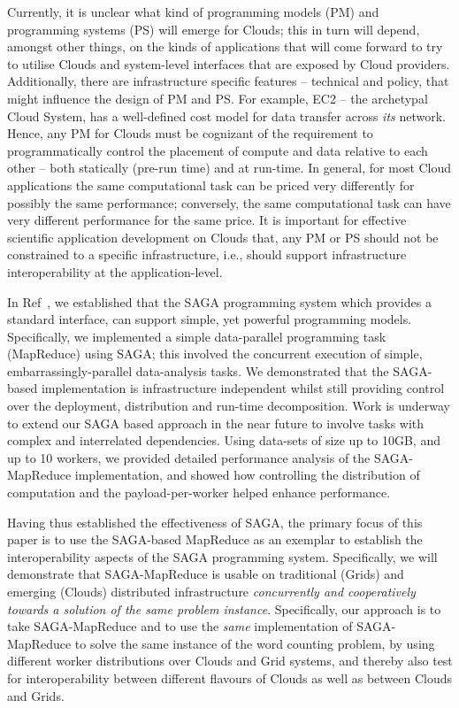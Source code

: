 \documentclass[conference,final]{IEEEtran}
\newcommand{\sagamapreduce }{SAGA-MapReduce }
\begin{document}
Currently, it is unclear what kind of programming models (PM) and
programming systems (PS) will emerge for Clouds; this in turn will
depend, amongst other things, on the kinds of applications that will
come forward to try to utilise Clouds and system-level interfaces that
are exposed by Cloud providers.  Additionally, there are
infrastructure specific features -- technical and policy, that might
influence the design of PM and PS. For example, EC2 -- the archetypal
Cloud System, has a well-defined cost model for data transfer across
{\it its} network. Hence, any PM for Clouds must be cognizant of the
requirement to programmatically control the placement of compute and
data relative to each other -- both statically (pre-run time) and at
run-time.  In general, for most Cloud applications the same
computational task can be priced very differently for possibly the
same performance; conversely, the same computational task can have
very different performance for the same price. It is important for
effective scientific application development on Clouds that, any PM or
PS should not be constrained to a specific infrastructure, i.e.,
should support infrastructure interoperability at the
application-level.

In Ref~\cite{saga_ccgrid09}, we established that the SAGA programming
system which provides a standard interface, %
can support simple, yet powerful programming models.  Specifically, we
implemented a simple data-parallel programming task (MapReduce) using
SAGA; this involved the concurrent execution of simple,
embarrassingly-parallel data-analysis tasks.  We demonstrated that the
SAGA-based implementation is infrastructure independent whilst still
providing control over the deployment, distribution and run-time
decomposition.  Work is underway to extend our SAGA based approach in
the near future to involve tasks with complex and interrelated
dependencies.  Using data-sets of size up to 10GB, and up to 10
workers, we provided detailed performance analysis of the
SAGA-MapReduce implementation, and showed how controlling the
distribution of computation and the payload-per-worker helped enhance
performance.


Having thus established the effectiveness of SAGA, the primary focus
of this paper is to use the SAGA-based MapReduce as an exemplar to
establish the interoperability aspects of the SAGA programming system.
Specifically, we will demonstrate that \sagamapreduce is usable on
traditional (Grids) and emerging (Clouds) distributed infrastructure
{\it concurrently and cooperatively towards a solution of the same
  problem instance}.  Specifically, our approach is to take
\sagamapreduce and to use the {\it same} implementation of
\sagamapreduce to solve the same instance of the word counting
problem, by using different worker distributions over Clouds and Grid
systems, and thereby also test for interoperability between different
flavours of Clouds as well as between Clouds and Grids.
\end{document}
